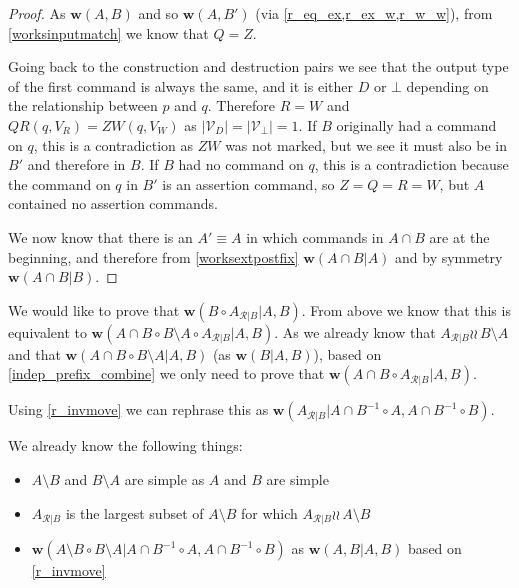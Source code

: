 \documentclass[12pt]{article}
\newcommand{\setvx}[1]{\mathcal{V}_{#1}}
\newcommand{\setd}{\setvx{D}} %
\newcommand{\setb}{\setvx{\empt}} %
\newcommand{\empt}{\bot}
\newcommand{\fscommand}[2]{{#1#2}}
\newcommand{\czw}{\fscommand{Z}{W}}
\newcommand{\cqr}{\fscommand{Q}{R}}
\newcommand{\cc}{\circ} %
\newcommand{\indep}{\wr\!\!\wr\,} %
\newcommand{\works}[1]{{\mathbf{w}}({#1})}
\newcommand{\worksc}[2]{{\mathbf{w}}({#1}|{#2})}
\newcommand{\ordered}[1]{#1}
\newcommand{\recchar}[3]{{#1}^{#3}_{\mathcal{R}|{#2}}}
\newcommand{\reca}{\recchar{A}{B}{}} %
\theoremstyle{definition}
\begin{document}
\begin{proof}
As $\works{A,B}$ and so $\works{A,B'}$ (via \cref{r_eq_ex,r_ex_w,r_w_w}), 
from \cref{worksinputmatch}
we know that $Q=Z$. 

Going back to the construction and destruction pairs we see that the output type of the first command
is always the same, and it is either $D$ or $\empt$ depending on the relationship between $p$ and $q$.
Therefore $R=W$ and $\cqr(q, V_R)=\czw(q, V_W)$
as $|\setd|=|\setb|=1$. 
If $B$ originally had a command on $q$,
this is a contradiction as $\czw$ was not marked, but we see it must also be in $B'$ and therefore in $B$.
If $B$ had no command on $q$,
this is a contradiction because the command on $q$ in $B'$ is an assertion command, so $Z=Q=R=W$, 
but $A$ contained no assertion commands.

\medskip

We now know that there is an $A'\equiv A$ in which commands in $A\cap B$
are at the beginning, and therefore 
from \cref{worksextpostfix}
$\worksc{\ordered{A\cap B}}{A}$ and by symmetry $\worksc{\ordered{A\cap B}}{B}$.
\end{proof}

\medskip

We would like to prove that $\worksc{B\cc \reca}{A,B}$.
From above we know that this is equivalent to
$\worksc{\ordered{A\cap B}\cc \ordered{B\setminus A}\cc \reca}{A,B}$.
As we already know that $\reca\indep B\setminus A$
and that $\worksc{\ordered{A\cap B}\cc \ordered{B\setminus A}}{A,B}$
(as $\worksc{B}{A,B}$),
based on \cref{indep_prefix_combine}
we only need to prove that
$\worksc{\ordered{A\cap B}\cc \reca}{A,B}$.

\newcommand{\acbi}{\ordered{A\cap B}^{-1}}
\newcommand{\amb}{A\setminus B}
\newcommand{\bma}{B\setminus A}
Using \cref{r_invmove} we can rephrase this as
$\worksc{\reca}{\acbi\cc A,\acbi\cc B}$.

We already know the following things:
\begin{itemize}
\item $\amb$ and $\bma$ are simple as $A$ and $B$ are simple
\item $\reca$ is the largest subset of $\amb$ for which $\reca\indep\amb$
\item $\worksc{\ordered{\amb}\cc \ordered{\bma}}{\acbi\cc A,\acbi\cc B}$ as $\worksc{A,B}{A,B}$ based on \cref{r_invmove}
\end{itemize}
\end{document}
